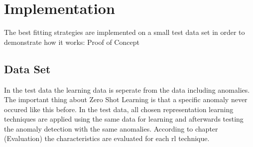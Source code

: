 \section{Implementation}\label{implementation}
The best fitting strategies are implemented on a small test data set in order to demonstrate how it works: Proof of Concept\\
\subsection{Data Set}
In the test data the learning data is seperate from the data including anomalies. The important thing about Zero Shot Learning is that a specific anomaly never occured like this before. In the test data, all chosen representation learning techniques are applied using the same data for learning and afterwards testing the anomaly detection with the same anomalies. According to chapter (Evaluation) the characteristics are evaluated for each rl technique.\\
%
%
%
%
%
